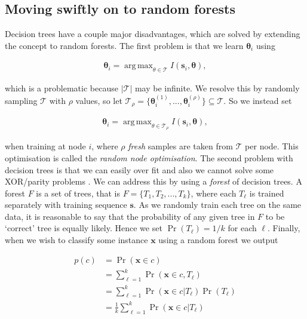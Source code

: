 \documentclass[12pt,twoside,notitlepage]{report}
\newcommand{\vc}[1]{\mathbf{#1}}
\newcommand{\cl}[1]{\mathcal{#1}}
\DeclareMathOperator*{\argmax}{arg\,max}
\begin{document}
        \subsection{Moving swiftly on to random forests} \label{sec:moving_swiftly_onto_forests}
            Decision trees have a couple major disadvantages, which are solved by extending the concept to random 
            forests. The first problem is that we learn $\vc{\theta}_i$ using

            \begin{align} 
                \vc{\theta}_i = \argmax_{\theta\in\cl{T}} I(\vc{s}_i, \vc{\theta}),
            \end{align}

            which is a problematic because $|\cl{T}|$ may be infinite. We resolve this by randomly sampling $\cl{T}$ with 
            $\rho$ values, so let $\cl{T}_\rho = \{ \vc{\theta}_i^{(1)}, ..., \vc{\theta}_i^{(\rho)} \} \subseteq \cl{T}$.
            So we instead set 

            \begin{align} 
                \vc{\theta}_i = \argmax_{\theta\in\cl{T}_\rho} I(\vc{s}_i, \vc{\theta}),
            \end{align}            

            when training at node $i$, where $\rho$ \textit{fresh} samples are taken from $\cl{T}$ per node. This 
            optimisation is called the \textit{random node optimisation}. The second problem with decision trees is that 
            we can easily over fit and also we cannot solve some XOR/parity problems \cite{criminisi2013decision}. We 
            can address this by using a \textit{forest} of decision trees. A forest $F$ is a set of trees, 
            that is $F = \{ T_1, T_2, ..., T_k \}$, where each $T_\ell$ is trained separately with training sequence 
            $\vc{s}$. As we randomly train each tree on the same data, it is reasonable to say that the probability of 
            any given tree in $F$ to be `correct' tree is equally likely. Hence we set $\Pr(T_\ell) = 1/k$ for each 
            $\ell$. Finally, when we wish to classify some instance $\vc{x}$ using a random forest we output 

            \begin{align}
                p(c) & = \Pr(\vc{x} \in c) \\
                    & = \sum_{\ell=1}^k \Pr(\vc{x} \in c, T_\ell) \\
                    & = \sum_{\ell=1}^k \Pr(\vc{x} \in c | T_\ell) \Pr(T_\ell) \\
                    & = \frac{1}{k} \sum_{\ell=1}^k \Pr(\vc{x} \in c | T_\ell)
            \end{align}
\end{document}
